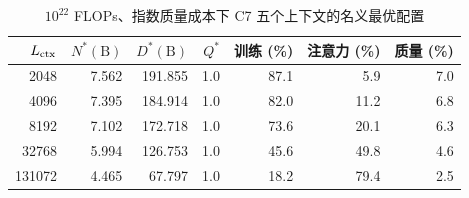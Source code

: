 \begin{table}[H]\centering\footnotesize
\caption{$10^{22}$ FLOPs、指数质量成本下 C7 五个上下文的名义最优配置}\label{tab:q3-v39-context}
\begin{tabular}{rrrrrrr}\toprule $L_{\rm ctx}$ & $N^*(\text{B})$ & $D^*(\text{B})$ & $Q^*$ & 训练 (\%)& 注意力 (\%) & 质量 (\%)\\\midrule
2048 & 7.562 & 191.855 & 1.0 & 87.1 & 5.9 & 7.0 \\
4096 & 7.395 & 184.914 & 1.0 & 82.0 & 11.2 & 6.8 \\
8192 & 7.102 & 172.718 & 1.0 & 73.6 & 20.1 & 6.3 \\
32768 & 5.994 & 126.753 & 1.0 & 45.6 & 49.8 & 4.6 \\
131072 & 4.465 & 67.797 & 1.0 & 18.2 & 79.4 & 2.5 \\
\bottomrule\end{tabular}\end{table}

